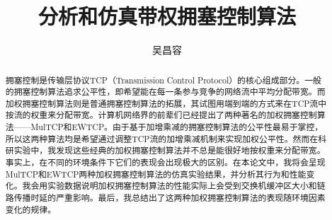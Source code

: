 \documentclass[winfonts]{njuthesis}
\title{分析和仿真带权拥塞控制算法}
\author{吴昌容}
\begin{document}
\maketitle

\begin{abstract}
  拥塞控制是传输层协议TCP（Transmission Control Protocol）的核心组成部分。一般的拥塞控制算法追求公平性，即希望能在每一条参与竞争的网络流中平均分配带宽。而加权拥塞控制算法则是普通拥塞控制算法的拓展，其试图用端到端的方式来在TCP流中按流的权重来分配带宽。计算机网络界的前辈们已经提出了两种著名的加权拥塞控制算法——MulTCP和EWTCP。由于基于加增乘减的拥塞控制算法的公平性最易于掌控，所以这两种算法均是希望通过调整TCP流的加增乘减机制来实现加权公平性。然而在科研实验中，我发现这些经典的加权拥塞控制算法并不总是能很好地按权重来分配带宽。事实上，在不同的环境条件下它们的表现会出现极大的区别。在本论文中，我将会呈现MulTCP和EWTCP两种加权拥塞控制算法的仿真实验结果，并分析其行为和性能变化。我会用实验数据说明加权拥塞控制算法的性能实际上会受到交换机缓冲区大小和链路传播时延的严重影响。最后，我总结出了这两种加权拥塞控制算法的表现随环境因素变化的规律。
\end{abstract}
\end{document}
